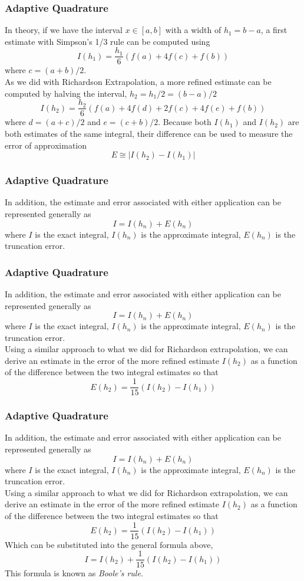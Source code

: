 \documentclass{if-beamer}
\begin{document}
\begin{frame}[t]
	\frametitle{Adaptive Quadrature}
	In theory, if we have the interval $x \in [a,b]$ with a width of $h_1 = b-a$, a first estimate with Simpson's 1/3 rule can be computed using
	$$ I(h_1) = \frac{h_1}{6}(f(a) + 4f(c) + f(b))$$ 
	where $c = (a+b)/2$. \\\vspace{5pt}
	As we did with Richardson Extrapolation, a more refined estimate can be computed by halving the interval, $h_2 = h_1/2 = (b-a)/2$
	$$I(h_2) =\frac{h_2}{6}(f(a) +4f(d) +2f(c) +4f(e) +f(b))$$
	where $d = (a+c)/2$ and $e = (c+b)/2$. 
	Because both $I(h_1)$ and $I(h_2)$ are both estimates of the same integral, their difference can be used to measure the error of approximation
	$$ E \cong |I(h_2) -I(h_1)|$$ 
\end{frame}


\begin{frame}[t]
	\frametitle{Adaptive Quadrature}
	In addition, the estimate and error associated with either application can be represented generally as 
	$$I = I(h_n) +E(h_n)$$
	where $I$ is the exact integral, $I(h_n)$ is the approximate integral, $E(h_n)$ is the truncation error. \\\vspace{5pt}

\end{frame}

\begin{frame}[t]
	\frametitle{Adaptive Quadrature}
	In addition, the estimate and error associated with either application can be represented generally as 
	$$I = I(h_n) +E(h_n)$$
	where $I$ is the exact integral, $I(h_n)$ is the approximate integral, $E(h_n)$ is the truncation error. \\\vspace{5pt}
	Using a similar approach to what we did for Richardson extrapolation, we can derive an estimate in the error of the more refined estimate $I(h_2)$ as a function of the difference between the two integral estimates so that 
	$$E(h_2)= \frac{1}{15}\left(I(h_2)-I(h_1)\right)$$
\end{frame}

\begin{frame}[t]
	\frametitle{Adaptive Quadrature}
	In addition, the estimate and error associated with either application can be represented generally as 
	$$I = I(h_n) +E(h_n)$$
	where $I$ is the exact integral, $I(h_n)$ is the approximate integral, $E(h_n)$ is the truncation error. \\\vspace{5pt}
	Using a similar approach to what we did for Richardson extrapolation, we can derive an estimate in the error of the more refined estimate $I(h_2)$ as a function of the difference between the two integral estimates so that 
	$$E(h_2)= \frac{1}{15}\left(I(h_2)-I(h_1)\right)$$
	Which can be substituted into the general formula above, 
	$$I = I(h_2) +  \frac{1}{15}\left(I(h_2)-I(h_1)\right)$$
	This formula is known as \textit{Boole's rule}.
\end{frame}
\end{document}
